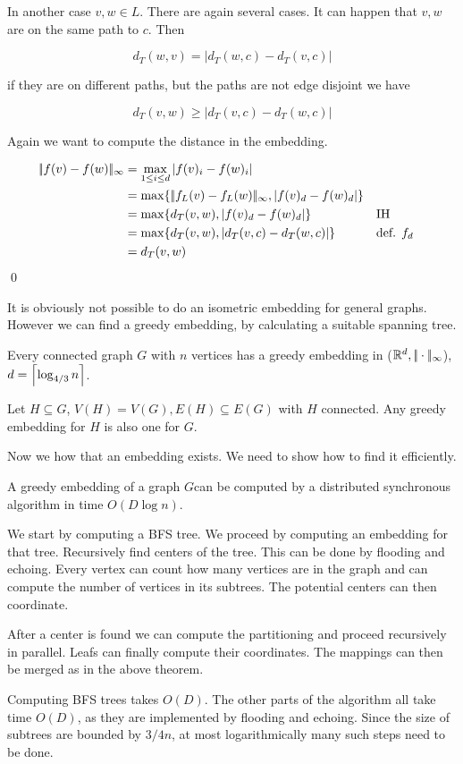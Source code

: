 \begin{pr}
In another case $v,w \in L$. There are again several cases. It can happen that $v,w$ are on the same path to $c$. Then

\[d_T(w,v) = | d_T(w,c)-d_T(v,c)|\]

if they are on different paths, but the paths are not edge disjoint we have

\[d_T(v,w) \geq |d_T(v,c) - d_T(w,c)|\] 

Again we want to compute the distance in the embedding.

\begin{align*}
|\!|f(v)-f(w)|\!|_\infty &= \max_{1\leq i\leq d} |f(v)_i-f(w)_i|\\
	&=\max \{	|\!|f_L(v)-f_L(w)|\!|_\infty, |f(v)_d-f(w)_d|\}\\
	&=\max\{ d_T(v,w), |f(v)_d-f(w)_d|\} && \text{IH}\\
	&=\max\{ d_T(v,w), |d_T(v,c)-d_T(w,c)|\} && \text{def. $f_d$}\\
	&= d_T(v,w)
\end{align*}
\hfill\qed
\end{pr}

It is obviously not possible to do an isometric embedding for general graphs. However we can find a greedy embedding, by calculating a suitable spanning tree.

\begin{thm} Every connected graph $G$ with $n$ vertices has a greedy embedding in ($\mathbb{R}^d,|\!|\cdot|\!|_{\infty}$), $d=\left\lceil \log_{4/3}n \right\rceil$.
\end{thm}

\begin{pr}
Let $H\subseteq G$, $V(H) = V(G), E(H) \subseteq E(G)$ with $H$ connected. Any greedy embedding for $H$ is also one for $G$. 
\end{pr}

Now we how that an embedding exists. We need to show how to find it efficiently.

\begin{thm} A greedy embedding of a graph $G$can be computed by a distributed synchronous algorithm in time $O(D\log n)$.\end{thm}

\begin{pr}[Sketch.] We start by computing a BFS tree. We proceed by computing an embedding for that tree. Recursively find centers of the tree. This can be done by flooding and echoing. Every vertex can count how many vertices are in the graph and can compute the number of vertices in its subtrees. The potential centers can then coordinate. 

After a center is found we can compute the partitioning and proceed recursively in parallel. Leafs can finally compute their coordinates. The mappings can then be merged as in the above theorem.

Computing BFS trees takes $O(D)$. The other parts of the algorithm all take time $O(D)$, as they are implemented by flooding and echoing. Since the size of subtrees are bounded by $3/4n$, at most logarithmically many such steps need to be done.
\end{pr}

